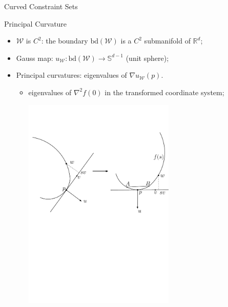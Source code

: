 \documentclass[final]{beamer} %
\newcommand{\cW}{\mathcal{W}}
\newcommand{\bd}{\mathrm{bd}}
\newcommand{\R}{\mathbb{R}}
\newcommand{\bS}{\mathbb{S}}
\begin{document}
\begin{frame}[c]
\begin{columns}[t,totalwidth=\textwidth]
	\begin{column}{.24\textwidth}%
		\begin{block}{Curved Constraint Sets}			
			\begin{minipage}{.9\linewidth}
					\begin{block}{Principal Curvature}
						\vspace{-1.5cm}
						\begin{itemize}
						\item $\cW$ is $C^2$: the boundary $\bd(\cW)$ is a $C^2$ submanifold of $\R^d$;
						\item Gauss map: $u_{\cW} : \bd(\cW) \to \bS^{d-1}$  (unit sphere);
						\item Principal curvatures: eigenvalues of  $\nabla u_{\cW}(p)$.
						\begin{itemize}
							\item eigenvalues of $\nabla^2 f(0)$ in the transformed coordinate system;
							\bigskip
							\begin{center}
								\hspace{-1cm}\includegraphics[width=0.6\textwidth]{figures/stronglyconvexset}
							\end{center}

\end{itemize}
\end{itemize}
\end{block}
\end{minipage}
\end{block}
\end{column}
\end{columns}
\end{frame}
\end{document}
